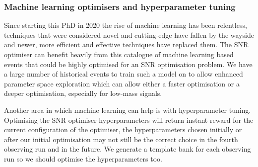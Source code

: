 \subsubsection{Machine learning optimisers and hyperparameter tuning}

Since starting this PhD in 2020 the rise of machine learning has been relentless, techniques that were considered novel and cutting-edge have fallen by the wayside and newer, more efficient and effective techniques have replaced them. The SNR optimiser can benefit heavily from this catalogue of machine learning based events that could be highly optimised for an SNR optimisation problem. We have a large number of historical events to train such a model on to allow enhanced parameter space exploration which can allow either a faster optimisation or a deeper optimisation, especially for low-mass signals.

Another area in which machine learning can help is with hyperparameter tuning. Optimising the SNR optimiser hyperparameters will return instant reward for the current configuration of the optimiser, the hyperparameters chosen initially or after our initial optimisation may not still be the correct choice in the fourth observing run and in the future. We generate a template bank for each observing run so we should optimise the hyperparameters too.





